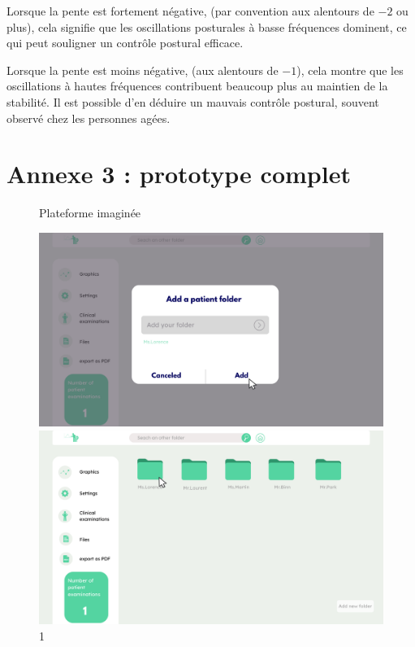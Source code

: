 Lorsque la pente est fortement négative, (par convention aux alentours de $-2$ ou plus), cela signifie que les oscillations posturales à basse fréquences dominent, ce qui peut souligner un contrôle postural efficace.

Lorsque la pente est moins négative, (aux alentours de $-1$), cela montre que les oscillations à hautes fréquences contribuent beaucoup plus au maintien de la stabilité.
Il est possible d'en déduire un mauvais contrôle postural, souvent observé chez les personnes agées.


\newpage
\section{Annexe 3 : prototype complet}

\begin{figure}[H]
    \centering
    \caption{Plateforme imaginée}
    \begin{minipage}{0.3\textwidth}
        \centering
        \includegraphics[width=\textwidth]{images/Prototype/1.png}
        \caption*{1}
    \end{minipage}
    \begin{minipage}{0.3\textwidth}
        \centering
        \includegraphics[width=\textwidth]{images/Prototype/Accueil de la plateforme de visualisation.png}

\end{minipage}
\end{figure}
